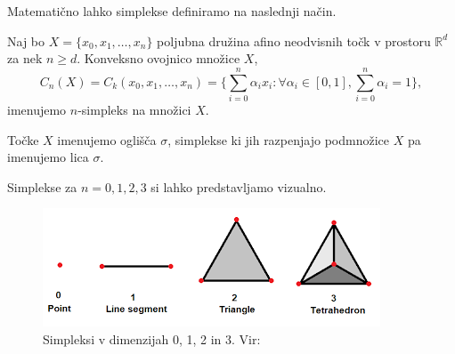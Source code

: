 Matematično lahko simplekse definiramo na naslednji način.
\begin{definicija}
Naj bo \(X = \{x_0, x_1, \dots, x_n\}\) poljubna družina afino neodvisnih točk v prostoru \(\mathbb{R}^d\) za nek \(n \geq d\). Konveksno ovojnico množice \(X\),
\[
C_n(X) = C_k(x_0, x_1, \dots, x_n) = \{\sum_{i=0}^n \alpha_i x_i : \forall \alpha_i \in [0, 1], \sum_{i=0}^n \alpha_i = 1\},
\]
imenujemo \(n\)-simpleks na množici \(X\).
\end{definicija}
Točke \(X\) imenujemo oglišča \(\sigma\), simplekse ki jih razpenjajo podmnožice \(X\) pa imenujemo lica \(\sigma\).

Simplekse za $n = 0, 1, 2, 3$ si lahko predstavljamo vizualno.

\begin{figure}[H]
    \centering
    \includegraphics{slike/simplex.png}
    \caption{Simpleksi v dimenzijah 0, 1, 2 in 3. Vir: \cite{schneider_simplexes}}
    \label{fig:enter-label}
\end{figure}

